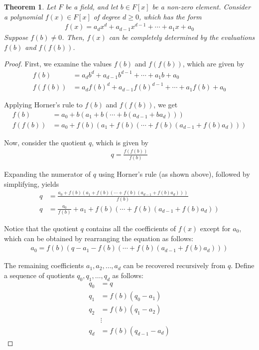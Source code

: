 \documentclass[12pt,reqno]{article}
\theoremstyle{plain}
\newtheorem{theorem}{Theorem}
\theoremstyle{definition}
\begin{document}
\begin{theorem} \label{theorem:encoding_fields}
Let $F$ be a field, and let $b \in F[x]$ be a non-zero element. Consider a polynomial $f(x) \in F[x]$ of degree $d \geq 0$, which has the form
\begin{align*}
f(x) = a_d x^d + a_{d-1} x^{d-1} + \cdots + a_1 x + a_0
\end{align*}
Suppose $f(b) \neq 0$. Then, $f(x)$ can be completely determined by the evaluations $f(b)$ and $f(f(b))$.
\end{theorem}
\begin{proof}
First, we examine the values $f(b)$ and $f(f(b))$, which are given by
\begin{align*}
f(b) &= a_d b^d + a_{d-1} b^{d-1} + \cdots + a_1 b + a_0 \\
f(f(b)) &= a_d f(b)^d + a_{d-1} f(b)^{d-1} + \cdots + a_1 f(b) + a_0 
\end{align*}

Applying Horner's rule \cite{press2007numerical} to $f(b)$ and $f(f(b))$, we get
\begin{align*}
f(b) &= a_0 + b (a_1 + b ( \cdots + b (a_{d-1} + b a_d))) \\
f(f(b)) &= a_0 + f(b) (a_1 + f(b) ( \cdots + f(b) (a_{d-1} + f(b) a_d)))
\end{align*}

Now, consider the quotient $q$, which is given by
\begin{align*}
q = \frac{f(f(b))}{f(b)}
\end{align*}

Expanding the numerator of $q$ using Horner's rule (as shown above), followed by simplifying, yields
\begin{align*}
q &= \frac{a_0 + f(b) (a_1 + f(b) ( \cdots + f(b) (a_{d-1} + f(b) a_d)))}{f(b)} \\
q &= \frac{a_0}{f(b)} + a_1 + f(b) ( \cdots + f(b) (a_{d-1} + f(b) a_d))
\end{align*}

Notice that the quotient $q$ contains all the coefficients of $f(x)$ except for $a_0$, which can be obtained by rearranging the equation as follows:
\begin{align*}
a_0 = f(b) \left(q - a_1 - f(b) ( \cdots + f(b) (a_{d-1} + f(b) a_d))\right)
\end{align*}

The remaining coefficients $a_1, a_2, \ldots, a_d$ can be recovered recursively from $q$. Define a sequence of quotients $q_0, q_1, \ldots, q_d$ as follows:
\begin{align*}
q_0 &= q \\
q_1 &= f(b) (q_0 - a_1) \\
q_2 &= f(b) (q_1 - a_2) \\
&\vdots \\
q_d &= f(b) (q_{d-1} - a_d)
\end{align*}


\end{proof}
\end{document}
